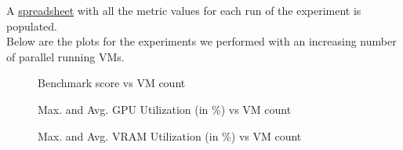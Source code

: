 \documentclass[a4paper,12pt, final]{report}
\begin{document}
\noindent A \href{https://docs.google.com/spreadsheets/d/1hZbSorDnwsLE9Sq_sm1WylsL8ZV26K7jDEhZbVOg9KE/edit?usp=sharing}{spreadsheet} with all the metric values for each run of the experiment is populated.\\

\noindent Below are the plots for the experiments we performed with an increasing number of parallel running VMs. \vspace{20pt}

\begin{figure}[H]
    \centering
    \caption{Benchmark score vs VM count}
    \label{fig:benchmark_score_vs_vm_count}
\end{figure}

\begin{figure}[H]
    \centering
    \caption{Max. and Avg. GPU Utilization (in \%) vs VM count}
    \label{fig:max_avg_gpu_util_vs_vm_count}
\end{figure}

\begin{figure}[H]
    \centering
    \caption{Max. and Avg. VRAM Utilization (in \%) vs VM count}
    \label{fig:max_avg_vram_util_vs_vm_count}
\end{figure}
\end{document}
